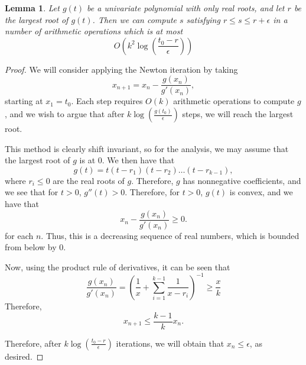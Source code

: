\documentclass{amsart}
\newtheorem{lemma}[theorem]{Lemma}
\theoremstyle{definition}
\begin{document}
\begin{lemma}
    \label{lem:newton}
    Let $g(t)$ be a univariate polynomial with only real roots, and let $r$ be the largest root of $g(t)$.
    Then we can compute $s$ satisfying $r \le s \le r + \epsilon$ in a number of arithmetic operations which is at most
    \[
        O(k^2\log(\frac{t_0-r}{\epsilon}))
    \]
\end{lemma}
\begin{proof}
    We will consider applying the Newton iteration by taking
    \[
        x_{n+1} = x_n - \frac{g(x_n)}{g'(x_n)},
    \]
    starting at $x_1 = t_0$. Each step requires $O(k)$ arithmetic operations to compute $g$, and we wish to argue that after $k\log(\frac{g(t_0)}{\epsilon})$ steps, we will reach the largest root.

    This method is clearly shift invariant, so for the analysis, we may assume that the largest root of $g$ is at 0. We then have that
    \[
        g(t) = t(t-r_1)(t - r_2)\dots(t-r_{k-1}),
    \]
    where $r_i \le 0$ are the real roots of $g$. Therefore, $g$ has nonnegative coefficients, and we see that for $t > 0$, $g''(t) > 0$.
    Therefore, for $t > 0$, $g(t)$ is convex, and we have that
    \[
        x_n - \frac{g(x_n)}{g'(x_n)} \ge 0.
    \]
    for each $n$. Thus, this is a decreasing sequence of real numbers, which is bounded from below by 0.

    Now, using the product rule of derivatives, it can be seen that
    \[
        \frac{g(x_n)}{g'(x_n)} = \left( \frac{1}{x}+\sum_{i = 1}^{k-1} \frac{1}{x-r_i} \right)^{-1} \ge \frac{x}{k}
    \]
    Therefore,
    \[
        x_{n+1} \le \frac{k-1}{k}x_n.
    \]

    Therefore, after $k\log(\frac{t_0-r}{\epsilon})$ iterations, we will obtain that $x_{n} \le \epsilon$, as desired.
\end{proof}
\end{document}
